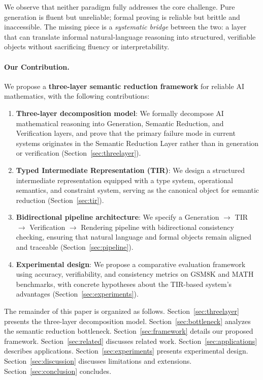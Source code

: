 \documentclass[11pt,a4paper]{article}
\begin{document}
We observe that neither paradigm fully addresses the core challenge. Pure generation is fluent but unreliable; formal proving is reliable but brittle and inaccessible. The missing piece is a \textit{systematic bridge} between the two: a layer that can translate informal natural-language reasoning into structured, verifiable objects without sacrificing fluency or interpretability.

\paragraph{Our Contribution.} We propose a \textbf{three-layer semantic reduction framework} for reliable AI mathematics, with the following contributions:

\begin{enumerate}[leftmargin=*,label=\textbf{C\arabic*}]
    \item \textbf{Three-layer decomposition model}: We formally decompose AI mathematical reasoning into Generation, Semantic Reduction, and Verification layers, and prove that the primary failure mode in current systems originates in the Semantic Reduction Layer rather than in generation or verification (Section~\ref{sec:threelayer}).
    
    \item \textbf{Typed Intermediate Representation (TIR)}: We design a structured intermediate representation equipped with a type system, operational semantics, and constraint system, serving as the canonical object for semantic reduction (Section~\ref{sec:tir}).
    
    \item \textbf{Bidirectional pipeline architecture}: We specify a Generation $\to$ TIR $\to$ Verification $\to$ Rendering pipeline with bidirectional consistency checking, ensuring that natural language and formal objects remain aligned and traceable (Section~\ref{sec:pipeline}).
    
    \item \textbf{Experimental design}: We propose a comparative evaluation framework using accuracy, verifiability, and consistency metrics on GSM8K and MATH benchmarks, with concrete hypotheses about the TIR-based system's advantages (Section~\ref{sec:experiments}).
\end{enumerate}

The remainder of this paper is organized as follows. Section~\ref{sec:threelayer} presents the three-layer decomposition model. Section~\ref{sec:bottleneck} analyzes the semantic reduction bottleneck. Section~\ref{sec:framework} details our proposed framework. Section~\ref{sec:related} discusses related work. Section~\ref{sec:applications} describes applications. Section~\ref{sec:experiments} presents experimental design. Section~\ref{sec:discussion} discusses limitations and extensions. Section~\ref{sec:conclusion} concludes.
\end{document}
